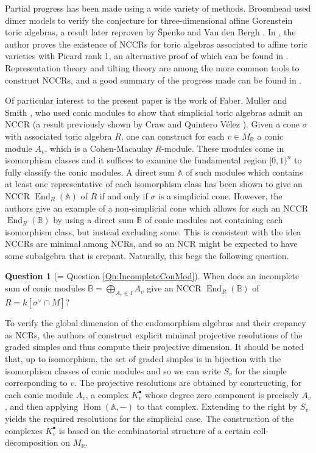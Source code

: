 \documentclass[reqno, 12pt]{amsart}
\theoremstyle{definition}
\numberwithin{equation}{section}
\newtheorem{question}[theorem]{Question}
\newcommand{\newterm}{\textsf}
\newcommand{\Hom}{\operatorname{Hom}}
\newcommand{\R}{\mathbb{R}}
\newcommand{\End}{\operatorname{End}}
\begin{document}
Partial progress has been made using a wide variety of methods. Broomhead \cite{Broomhead} used dimer models to verify the conjecture for three-dimensional affine Gorenstein toric algebras, a result later reproven by \v{S}penko and Van den Bergh \cite{SVdBtoricII}. In \cite{Tomo25}, the author proves the existence of NCCRs for toric algebras associated to affine toric varieties with Picard rank 1, an alternative proof of which can be found in \cite{MS26}. Representation theory and tilting theory are among the more common tools to construct NCCRs, and a good summary of the progress made can be found in \cite{VdB23}. 

Of particular interest to the present paper is the work of Faber, Muller and Smith \cite{FMS19}, who used \newterm{conic modules} to show that simplicial toric algebras admit an NCCR (a result previously shown by Craw and Quintero V\'{e}lez \cite{CQV12}). Given a cone $\sigma$ with associated toric algebra $R$, one can construct for each $v\in M_\R$ a conic module $A_v$, which is a Cohen-Macaulay $R$-module. These modules come in isomorphism classes and it suffices to examine the fundamental region $[0,1)^n$ to fully classify the conic modules. A direct sum $\mathbb{A}$ of such modules which contains at least one representative of each isomorphism class has been shown to give an NCCR $\End_R(\mathbb{A})$ of $R$ if and only if $\sigma$ is a simplicial cone. However, the authors give an example of a non-simplicial cone which allows for such an NCCR $\End_R(\mathbb{B})$ by using a direct sum $\mathbb{B}$ of conic modules not containing each isomorphism class, but instead excluding some. This is consistent with the idea NCCRs are minimal among NCRs, and so an NCR might be expected to have some subalgebra that is crepant. Naturally, this begs the following question.
\begin{question}[= Question \ref{Qn:IncompleteConMod}]
\label{Qn:IntroInc}
When does an incomplete sum of conic modules $\mathbb{B}=\bigoplus_{A_v\in I} A_v$ give an NCCR $\End_R(\mathbb{B})$ of $R=k[\sigma^\vee\cap M]$?
\end{question}

To verify the global dimension of the endomorphism algebras and their crepancy as NCRs, the authors of \cite{FMS19} construct explicit minimal projective resolutions of the graded simples and thus compute their projective dimension. It should be noted that, up to isomorphism, the set of graded simples is in bijection with the isomorphism classes of conic modules and so we can write $S_v$ for the simple corresponding to $v$. The projective resolutions are obtained by constructing, for each conic module $A_v$, a complex $K_v^\bullet$ whose degree zero component is precisely $A_v$, and then applying $\Hom(\mathbb{A},-)$ to that complex. Extending to the right by $S_v$ yields the required resolutions for the simplicial case. The construction of the complexes $K_v^\bullet$ is based on the combinatorial structure of a certain cell-decomposition on $M_\R$.
\end{document}
